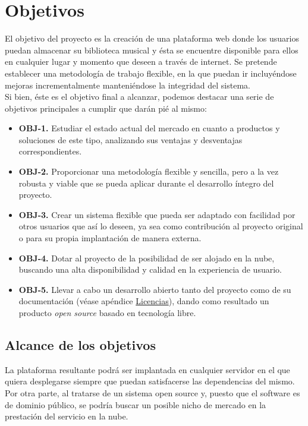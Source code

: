 \chapter{Objetivos}
\label{cap:objetivos}

El objetivo del proyecto es la creación de una plataforma web donde los usuarios puedan almacenar su biblioteca musical y ésta se encuentre disponible para ellos en cualquier lugar y momento que deseen a través de internet. Se pretende establecer una metodología de trabajo flexible, en la que puedan ir incluyéndose mejoras incrementalmente manteniéndose la integridad del sistema. \\

Si bien, éste es el objetivo final a alcanzar, podemos destacar una serie de objetivos principales a cumplir que darán pié al mismo:

\begin{itemize}
	\item \textbf{OBJ-1.} Estudiar el estado actual del mercado en cuanto a productos y soluciones de este tipo, analizando sus ventajas y desventajas correspondientes.

	\item \textbf{OBJ-2.} Proporcionar una metodología flexible y sencilla, pero a la vez robusta y viable que se pueda aplicar durante el desarrollo íntegro del proyecto. 

	\item \textbf{OBJ-3.} Crear un sistema flexible que pueda ser adaptado con facilidad por otros usuarios que así lo deseen, ya sea como contribución al proyecto original o para su propia implantación de manera externa.

	\item \textbf{OBJ-4.} Dotar al proyecto de la posibilidad de ser alojado en la nube, buscando una alta disponibilidad y calidad en la experiencia de usuario.

	\item \textbf{OBJ-5.} Llevar a cabo un desarrollo abierto tanto del proyecto como de su documentación (véase apéndice \hyperref[sec:licencias]{Licencias}), dando como resultado un producto \textit{open source} basado en tecnología libre.
\end{itemize}

\bigskip

\section{Alcance de los objetivos}

La plataforma resultante podrá ser implantada en cualquier servidor en el que quiera desplegarse siempre que puedan satisfacerse las dependencias del mismo. Por otra parte, al tratarse de un sistema open source y, puesto que el software es de dominio público, se podría buscar un posible nicho de mercado en la prestación del servicio en la nube.
